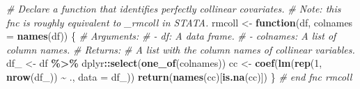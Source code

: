 \documentclass[
]{article}
\newenvironment{Shaded}{\begin{snugshade}}{\end{snugshade}}
\newcommand{\AttributeTok}[1]{\textcolor[rgb]{0.13,0.29,0.53}{#1}}
\newcommand{\CommentTok}[1]{\textcolor[rgb]{0.56,0.35,0.01}{\textit{#1}}}
\newcommand{\ControlFlowTok}[1]{\textcolor[rgb]{0.13,0.29,0.53}{\textbf{#1}}}
\newcommand{\DecValTok}[1]{\textcolor[rgb]{0.00,0.00,0.81}{#1}}
\newcommand{\FunctionTok}[1]{\textcolor[rgb]{0.13,0.29,0.53}{\textbf{#1}}}
\newcommand{\NormalTok}[1]{#1}
\newcommand{\OtherTok}[1]{\textcolor[rgb]{0.56,0.35,0.01}{#1}}
\newcommand{\SpecialCharTok}[1]{\textcolor[rgb]{0.81,0.36,0.00}{\textbf{#1}}}
\begin{document}
\begin{Shaded}
\begin{Highlighting}[]
\CommentTok{\# Declare a function that identifies perfectly collinear covariates.}
\CommentTok{\# Note: this fnc is roughly equivalent to \_rmcoll in STATA.}
\NormalTok{rmcoll }\OtherTok{\textless{}{-}} \ControlFlowTok{function}\NormalTok{(df, }\AttributeTok{colnames =} \FunctionTok{names}\NormalTok{(df)) \{}
  \CommentTok{\# Arguments:}
  \CommentTok{\# {-} df: A data frame.}
  \CommentTok{\# {-} colnames: A list of column names.}
  \CommentTok{\# Returns:}
  \CommentTok{\# A list with the column names of collinear variables.}
\NormalTok{    df\_ }\OtherTok{\textless{}{-}}\NormalTok{ df }\SpecialCharTok{\%\textgreater{}\%}\NormalTok{ dplyr}\SpecialCharTok{::}\FunctionTok{select}\NormalTok{(}\FunctionTok{one\_of}\NormalTok{(colnames))}
\NormalTok{    cc }\OtherTok{\textless{}{-}} \FunctionTok{coef}\NormalTok{(}\FunctionTok{lm}\NormalTok{(}\FunctionTok{rep}\NormalTok{(}\DecValTok{1}\NormalTok{, }\FunctionTok{nrow}\NormalTok{(df\_)) }\SpecialCharTok{\textasciitilde{}}\NormalTok{ ., }\AttributeTok{data =}\NormalTok{ df\_))}
    \FunctionTok{return}\NormalTok{(}\FunctionTok{names}\NormalTok{(cc)[}\FunctionTok{is.na}\NormalTok{(cc)])}
\NormalTok{\} }\CommentTok{\# end fnc rmcoll}
\end{Highlighting}
\end{Shaded}
\end{document}
